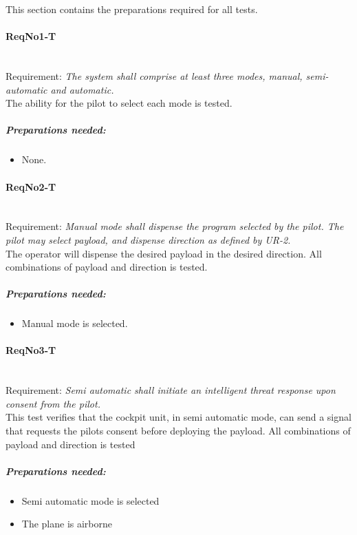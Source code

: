 \noindent
This section contains the preparations required for all tests.

\paragraph{ReqNo1-T}\mbox{}\\ %
Requirement: \textit{The system shall comprise at least three modes, manual, semi-automatic and automatic.}
\\
The ability for the pilot to select each mode is tested.

	\subparagraph{Preparations needed:}
	\begin{itemize}
	\item None.
	\end{itemize}


\paragraph{ReqNo2-T}\mbox{}\\ %
Requirement: \textit{Manual mode shall dispense the program selected by the pilot. The pilot may select payload, and dispense direction as defined by UR-2.}
\\
The operator will dispense the desired payload in the desired direction. All combinations of payload and direction is tested.
\\
	\subparagraph{Preparations needed:}
	\begin{itemize}
	\item Manual mode is selected.
	\end{itemize}


\paragraph{ReqNo3-T}\mbox{}\\ %
Requirement: \textit{Semi automatic shall initiate an intelligent threat response upon consent from the pilot.}
\\
This test verifies that the cockpit unit, in semi automatic mode, can send a signal that requests the pilots consent before deploying the payload. All combinations of payload and direction is tested
\\
	\subparagraph{Preparations needed:}
	\begin{itemize} 
	\item Semi automatic mode is selected
	\item The plane is airborne
	\end{itemize}

